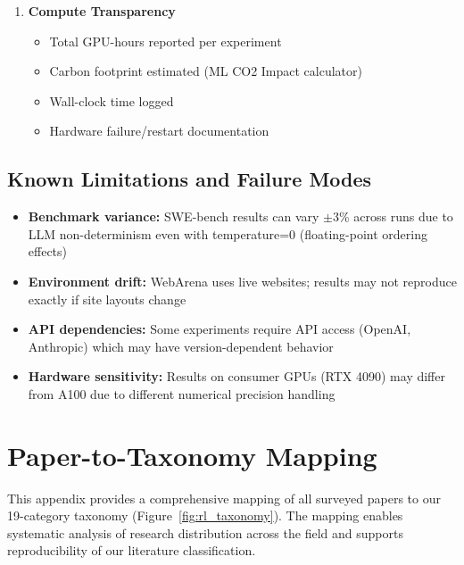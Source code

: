 \documentclass[12pt,a4paper]{report}
\theoremstyle{definition}
\begin{document}
\begin{enumerate}[leftmargin=*]
    \item \textbf{Compute Transparency}
    \begin{itemize}[nosep]
        \item[$\square$] Total GPU-hours reported per experiment
        \item[$\square$] Carbon footprint estimated (ML CO2 Impact calculator)
        \item[$\square$] Wall-clock time logged
        \item[$\square$] Hardware failure/restart documentation
    \end{itemize}
\end{enumerate}

\section*{Known Limitations and Failure Modes}

\begin{itemize}
    \item \textbf{Benchmark variance:} SWE-bench results can vary $\pm$3\% across runs due to LLM non-determinism even with temperature=0 (floating-point ordering effects)
    \item \textbf{Environment drift:} WebArena uses live websites; results may not reproduce exactly if site layouts change
    \item \textbf{API dependencies:} Some experiments require API access (OpenAI, Anthropic) which may have version-dependent behavior
    \item \textbf{Hardware sensitivity:} Results on consumer GPUs (RTX 4090) may differ from A100 due to different numerical precision handling
\end{itemize}

\chapter{Paper-to-Taxonomy Mapping}
\label{app:paper_mapping}

This appendix provides a comprehensive mapping of all surveyed papers to our 19-category taxonomy (Figure~\ref{fig:rl_taxonomy}). The mapping enables systematic analysis of research distribution across the field and supports reproducibility of our literature classification.
\end{document}
